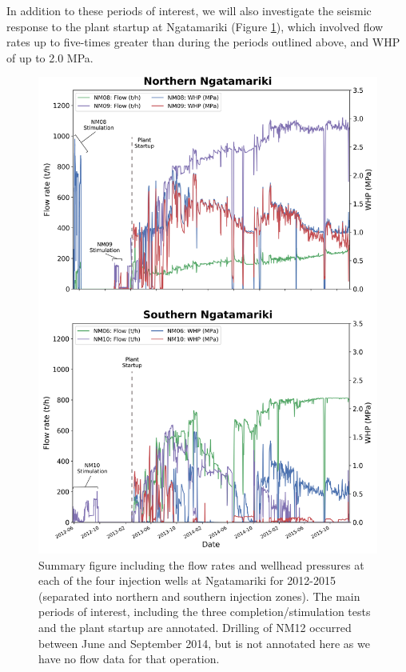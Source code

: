In addition to these periods of interest, we will also investigate the seismic response to the plant startup at Ngatamariki (Figure \ref{953396}), which involved flow rates up to five-times greater than during the periods outlined above, and WHP of up to 2.0 MPa.

\begin{figure}[h!]
\begin{center}
\includegraphics[width=0.84\columnwidth]{Chapter_1_Intro/figures/NgaN_ALL_flows_WHP/Ngatamariki_overview_Intro_original}
\caption{{Summary figure including the flow rates and wellhead pressures at each
of the four injection wells at Ngatamariki for 2012-2015 (separated into
northern and southern injection zones). The main periods of interest,
including the three completion\slash{stimulation} tests and the plant startup
are annotated. Drilling of NM12 occurred between June and September 2014, but is not annotated here as we have no flow data for that operation.
{\label{953396}}%
}}
\end{center}
\end{figure}

